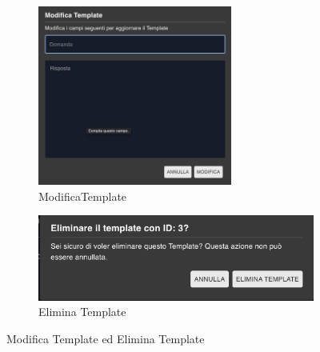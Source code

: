 \begin{figure}[h!]
    \centering
    \begin{subfigure}{0.5\textwidth}
        \centering
        \includegraphics[width=0.7\textwidth]{./img/ModificaTemplate.png}
        \caption{ModificaTemplate}
    \end{subfigure}
    \hspace{0.05\textwidth}
    \begin{subfigure}{0.5\textwidth}
        \centering
        \includegraphics[width=\textwidth]{./img/EliminaTemplate.png}
        \caption{Elimina Template}
    \end{subfigure}
    \caption{Modifica Template ed Elimina Template}
    \label{fig:pop-up modifica ed elimina}
\end{figure}


